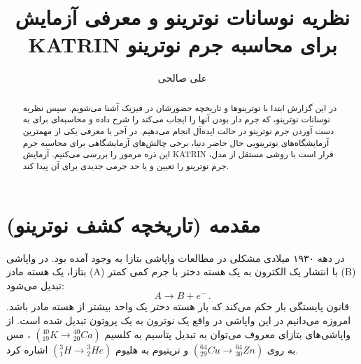 \documentclass[a4paper,11pt,oneside,openany]{iut-thesis}
\begin{document}
	

\subject{
	مکانیک کوانتومی ۲
}
\field{
}
\title{
	نظریه نوسانات نوترینو و معرفی آزمایش KATRIN برای محاسبه جرم نوترینو
}
\tit{}
\secsupervisor{
}
\advisor{
}
\secadvisor{} 
\author{
	علی صالحی
}
\thesisdate{\today}

\makefatitle



\begin{abstract}
در این گزارش ابتدا با نوترینوها و تاریخچه حضورشان در فیزیک آشنا می‌شویم. سپس نظریه نوسانات نوترینو، که جرم دار بودن آنها را ایجاب می‌کند را شرح داده و محاسبه‌ای برای به دست آوردن جرم نوترینو در حالت ایده‌آل انجام می‌دهیم. در آخر با معرفی یکی از مهمترین آزمایشگاه‌های نوترینویی حال حاضر دنیا، برخی چالش‌های آزمایشگاهی برای محاسبه جرم این ذره مرموز را بررسی می‌کنیم. آزمایش KATRIN قرار است با روشی مستقل از مدل، جرم نوترینو را تعیین و یا حد جرمی جدیدی برای آن پیدا کند.
\end{abstract}
\newpage

\tableofcontents

\newpage


\section{
مقدمه (تاریخچه کشف نوترینو)
}
در دهه ۱۹۳۰ میلادی مشکلی در مطالعات واپاشی بتازا به وجود آمده بود. در واپاشی بتازا، یک هسته مادر (A) با انتشار یک الکترون به یک هسته دختر با جرم کمی کمتر (B) تبدیل می‌شود:
\begin{equation}
A \rightarrow B + e^{-}\,.
\end{equation}
قانون پایستگی بار حکم می‌کند که بار هسته دختر یک واحد بیشتر از هسته مادر باشد. امروزه می‌دانیم در این واپاشی در واقع یک نوترون به یک پروتون تبدیل شده است. از واپاشی‌های بتازای معروف می‌توان به تبدیل پتاسیم به کلسیم
$({^{40}_{19}K} \rightarrow {^{40}_{20}Ca})$
، مس به روی
$({^{64}_{29}Cu} \rightarrow {^{64}_{30}Zn})$
و تریتیوم به هلیوم
$({^{3}_{1}H} \rightarrow {^{3}_{2}He})$
 اشاره کرد.
\end{document}
